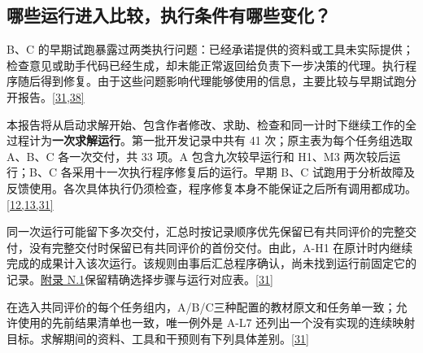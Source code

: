 \subsection[哪些运行进入比较，执行条件有哪些变化？]{\texorpdfstring{\protect\hypertarget{section-2-3}{}哪些运行进入比较，执行条件有哪些变化？}{哪些运行进入比较，执行条件有哪些变化？}}
B、C 的早期试跑暴露过两类执行问题：已经承诺提供的资料或工具未实际提供；检查意见或助手代码已经生成，却未能正常返回给负责下一步决策的代理。执行程序随后得到修复。由于这些问题影响代理能够使用的信息，主要比较与早期试跑分开报告。\hyperlink{ref-31}{\mbox{[31,38]}}

本报告将从启动求解开始、包含作者修改、求助、检查和同一计时下继续工作的全过程计为\textbf{一次求解运行}。第一批开发记录中共有 41 次；原主表为每个任务组选取 A、B、C 各一次交付，共 33 项。A 包含九次较早运行和 H1、M3 两次较后运行；B、C 各采用十一次执行程序修复后的运行。早期 B、C 试跑用于分析故障及反馈使用。各次具体执行仍须检查，程序修复本身不能保证之后所有调用都成功。\hyperlink{ref-12}{\mbox{[12,13,31]}}

同一次运行可能留下多次交付，汇总时按记录顺序优先保留已有共同评价的完整交付，没有完整交付时保留已有共同评价的首份交付。由此，A-H1 在原计时内继续完成的成果计入该次运行。该规则由事后汇总程序确认，尚未找到运行前固定它的记录。\href{zh-appendix.pdf\#n1}{附录 N.1}保留精确选择步骤与运行对应表。\hyperlink{ref-31}{\mbox{[31]}}

在选入共同评价的每个任务组内，A/B/C三种配置的教材原文和任务单一致；允许使用的先前结果清单也一致，唯一例外是 A-L7 还列出一个没有实现的连续映射目标。求解期间的资料、工具和干预则有下列具体差别。\hyperlink{ref-31}{\mbox{[31]}}


